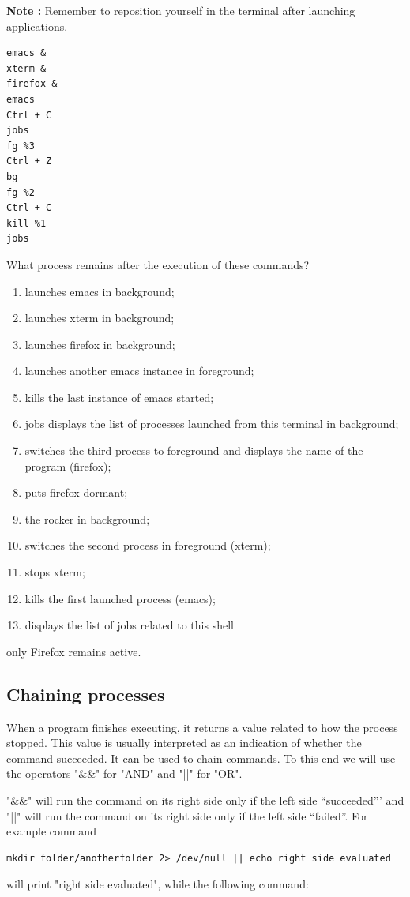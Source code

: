 \documentclass[11pt]{article}
\begin{document}
\noindent \textbf{Note :} Remember to reposition yourself in the terminal after launching applications.

\begin{lstlisting}
emacs &
xterm &
firefox &
emacs
Ctrl + C
jobs
fg %3
Ctrl + Z
bg
fg %2
Ctrl + C
kill %1
jobs
\end{lstlisting}

What process remains after the execution of these commands?

\begin{solution}
 \begin{enumerate}
\item launches emacs in background;
\item launches xterm in background;
\item launches firefox in background;
\item launches another emacs instance in foreground;
\item kills the last instance of emacs started;
\item jobs displays the list of processes launched from this terminal in background;
\item switches the third process to foreground and displays the name of the program (firefox);
\item puts firefox dormant;
\item the rocker in background;
\item switches the second process in foreground (xterm);
\item stops xterm;
\item kills the first launched process (emacs);
\item displays the list of jobs related to this shell
 \end{enumerate}

only Firefox remains active.

\end{solution}

\subsection{Chaining processes}

When a program finishes executing, it returns a value related to how the process stopped. This value is usually interpreted as an indication of whether the command succeeded. It can be used to chain commands. To this end we will use the operators "\&\&" for "AND" and "||" for "OR".
\smallskip

\noindent "\&\&"  will run the command on its right side only if the left side “succeeded”’ and "||" will run the command
on its right side only if the left side “failed”. For example command \\
\begin{lstlisting}
mkdir folder/anotherfolder 2> /dev/null || echo right side evaluated
\end{lstlisting}
will print "right side evaluated", while the following command:\\
\end{document}
